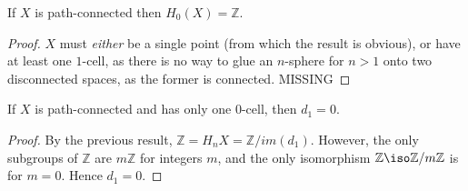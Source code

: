 \begin{proposition}
If $X$ is path-connected then $H_0(X)=\mathbb{Z}$. 
\end{proposition}
\begin{proof}
$X$ must \textit{either} be a single point (from which the result is obvious), or have at least one $1$-cell, as there is no way to glue an $n$-sphere for $n>1$ onto two disconnected spaces, as the former is connected.
MISSING
\end{proof}

\begin{corollary}
If $X$ is path-connected and has only one $0$-cell, then $d_1=0$.
\end{corollary}
\begin{proof}
By the previous result, $\mathbb{Z}=H_nX=\mathbb{Z}/im(d_1)$. However, the only subgroups of $\mathbb{Z}$ are $m\mathbb{Z}$ for integers $m$, and the only isomorphism $\mathbb{Z}\iso \mathbb{Z}/m\mathbb{Z}$ is for $m=0$. Hence $d_1=0$.
\end{proof}


